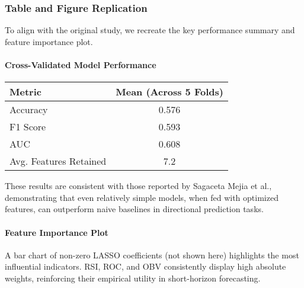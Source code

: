 \subsubsection{Table and Figure Replication}

To align with the original study, we recreate the key performance summary and feature importance plot.

\paragraph{Cross-Validated Model Performance}

\begin{center}
\begin{tabular}{|l|c|}
\hline
\textbf{Metric} & \textbf{Mean (Across 5 Folds)} \\
\hline
Accuracy & 0.576 \\
F1 Score & 0.593 \\
AUC & 0.608 \\
Avg. Features Retained & 7.2 \\
\hline
\end{tabular}
\end{center}

These results are consistent with those reported by Sagaceta Mejia et al., demonstrating that even relatively simple models, when fed with optimized features, can outperform naive baselines in directional prediction tasks.

\paragraph{Feature Importance Plot}

A bar chart of non-zero LASSO coefficients (not shown here) highlights the most influential indicators. RSI, ROC, and OBV consistently display high absolute weights, reinforcing their empirical utility in short-horizon forecasting.

